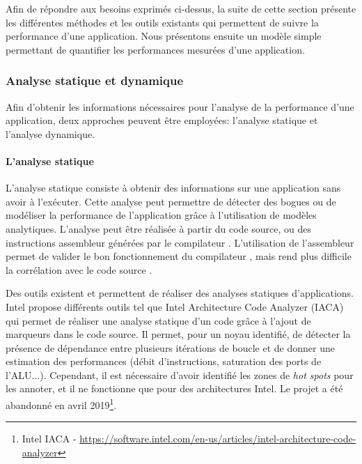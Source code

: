          Afin de répondre aux besoins exprimés ci-dessus, la suite de cette section présente les différentes méthodes et les outils existants qui permettent de suivre la performance d'une application. Nous présentons ensuite un modèle simple permettant de quantifier les performances mesurées d'une application.
           
      
 
    \subsubsection{Analyse statique et dynamique}
        
        Afin d'obtenir les informations nécessaires pour l'analyse de la performance d'une application, deux approches peuvent être employées: l'analyse statique et l'analyse dynamique.
        
        \paragraph{L'analyse statique}
            
            L’analyse statique consiste à obtenir des informations sur une application sans avoir à l'exécuter. Cette analyse peut permettre de détecter des bogues \cite{Lattner2016} ou de modéliser la performance de l'application grâce à l'utilisation de modèles analytiques. L'analyse peut être réalisée à partir du code source, ou des instructions assembleur générées par le compilateur \cite{Djoudi2005, wong2015vp3}. L'utilisation de l'assembleur permet de valider le bon fonctionnement du compilateur \cite{charif2014cqa}, mais rend plus difficile la corrélation avec le code source \cite{de2010new}.
            
            Des outils existent et permettent de réaliser des analyses statiques d'applications. 
            Intel propose différents outils tel que Intel Architecture Code Analyzer (IACA) \cite{Hirsh2012} qui permet de réaliser une analyse statique d'un code grâce à l'ajout de marqueurs dans le code source. Il permet, pour un noyau identifié, de détecter la présence de dépendance entre plusieurs itérations de boucle et de donner une estimation des performances (débit d'instructions, saturation des ports de l'ALU...). Cependant, il est nécessaire d'avoir identifié les zones de \textit{hot spots} pour les annoter, et il ne fonctionne que pour des architectures Intel. Le projet a été abandonné en avril 2019\footnote{Intel IACA - \url{https://software.intel.com/en-us/articles/intel-architecture-code-analyzer}}.
        
